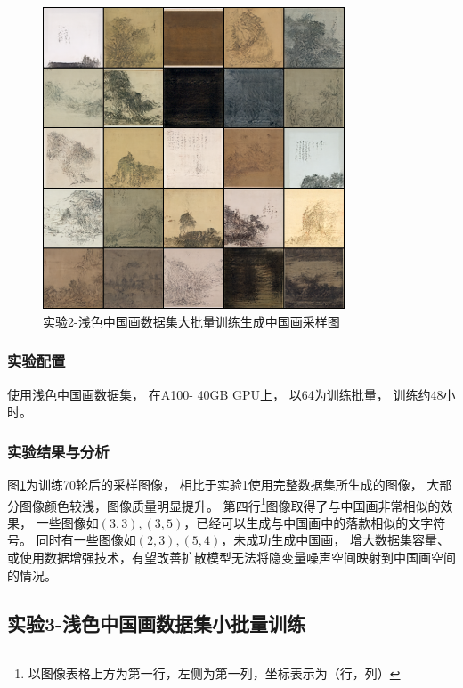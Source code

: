 \begin{figure}[H]
    \centering
    \includegraphics[width=0.8\textwidth]{figures/diffusion/results2/sample-70.png}
    \caption{实验2-浅色中国画数据集大批量训练生成中国画采样图}\label{fig:diffusion_results2_sample70}
\end{figure}

\subsubsection{实验配置}
使用浅色中国画数据集，
在A100- 40GB GPU上，
以64为训练批量，
训练约48小时。
\subsubsection{实验结果与分析}

图{\ref{fig:diffusion_results2_sample70}}为训练70轮后的采样图像，
相比于实验1使用完整数据集所生成的图像，
大部分图像颜色较浅，图像质量明显提升。
第四行{\footnote{以图像表格上方为第一行，左侧为第一列，坐标表示为（行，列）}}图像取得了与中国画非常相似的效果，
一些图像如{$(3,3),(3,5)$}，已经可以生成与中国画中的落款相似的文字符号。
同时有一些图像如{$(2,3),(5,4)$}，未成功生成中国画，
增大数据集容量、或使用数据增强技术，有望改善扩散模型无法将隐变量噪声空间映射到中国画空间的情况。






\subsection{实验3-浅色中国画数据集小批量训练}

